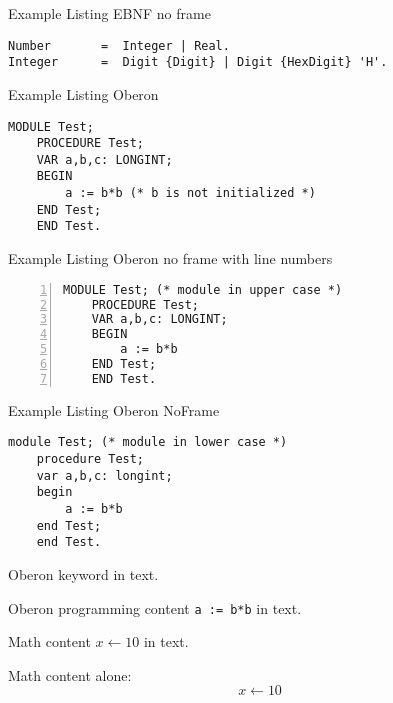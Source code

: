 \documentclass[a4paper,11pt]{article}
\newcommand{\changefont}[3]{\fontfamily{#1}\fontseries{#2}\fontshape{#3}\selectfont}
\newcommand{\kwfont}{\changefont{pcr}{b}{n}}
\newcommand{\kw}[1]{\makebox{\kwfont #1}}
\begin{document}
Example Listing EBNF no frame
\begin{lstlisting}[language=ebnf,frame=none]
Number       =  Integer | Real.
Integer      =  Digit {Digit} | Digit {HexDigit} 'H'.
\end{lstlisting}


Example Listing Oberon
\begin{lstlisting}[language=Oberon]
    MODULE Test;
    PROCEDURE Test;
    VAR a,b,c: LONGINT;
    BEGIN
        a := b*b (* b is not initialized *)
    END Test;
    END Test.
\end{lstlisting}

Example Listing Oberon no frame with line numbers
\begin{lstlisting}[language=Oberon,frame=none,numbers=left]
    MODULE Test; (* module in upper case *)
    PROCEDURE Test;
    VAR a,b,c: LONGINT;
    BEGIN
        a := b*b
    END Test;
    END Test.
\end{lstlisting}

Example Listing Oberon NoFrame
\begin{lstlisting}[language=Oberon,frame=none]
    module Test; (* module in lower case *)
    procedure Test;
    var a,b,c: longint;
    begin
        a := b*b
    end Test;
    end Test.
\end{lstlisting}

Oberon keyword \kw{module} in text.

Oberon programming content \verb+a := b*b+ in text.

Math content $x \leftarrow 10$ in text.

Math content alone:
$$x \leftarrow 10$$
\end{document}
